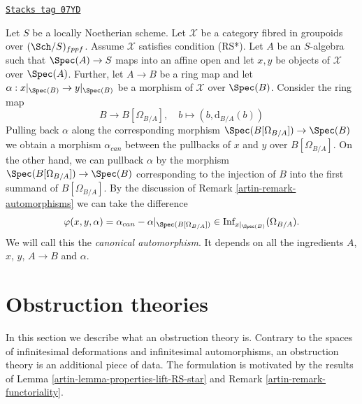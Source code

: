 \begin{remark}

\label{artin-remark-canonical-isomorphism}
\href{https://stacks.math.columbia.edu/tag/07YD}{\texttt{Stacks tag 07YD}}

Let $S$ be a locally Noetherian scheme. Let $\mathcal{X}$ be a category
fibred in groupoids over $(\Sch/S)_{fppf}$. Assume $\mathcal{X}$ satisfies
condition (RS*). Let $A$ be an $S$-algebra such that
$\Spec(A) \to S$ maps into an affine open and let $x, y$ be objects of
$\mathcal{X}$ over $\Spec(A)$. Further, let $A \to B$ be a ring map and
let $\alpha : x|_{\Spec(B)} \to y|_{\Spec(B)}$ be a morphism of
$\mathcal{X}$ over $\Spec(B)$. Consider the ring map
$$
B \longrightarrow B[\Omega_{B/A}],
\quad
b \longmapsto (b, \text{d}_{B/A}(b))
$$
Pulling back $\alpha$ along the corresponding morphism
$\Spec(B[\Omega_{B/A}]) \to \Spec(B)$ we obtain a
morphism $\alpha_{can}$ between the pullbacks of $x$ and $y$ over
$B[\Omega_{B/A}]$. On the other hand, we can pullback $\alpha$
by the morphism $\Spec(B[\Omega_{B/A}]) \to \Spec(B)$ corresponding
to the injection of $B$ into the first summand of $B[\Omega_{B/A}]$.
By the discussion of Remark \ref{artin-remark-automorphisms}
we can take the difference
$$
\varphi(x, y, \alpha) = \alpha_{can} - \alpha|_{\Spec(B[\Omega_{B/A}])} \in
\text{Inf}_{x|_{\Spec(B)}}(\Omega_{B/A}).
$$
We will call this the {\it canonical automorphism}. It depends
on all the ingredients $A$, $x$, $y$, $A \to B$ and $\alpha$.
\end{remark}

\section{Obstruction theories}
\label{artin-section-obstruction-theory}
In this section we describe what an obstruction theory is.
Contrary to the spaces of infinitesimal deformations and infinitesimal
automorphisms, an obstruction theory is an additional piece of data.
The formulation is motivated by the results of
Lemma \ref{artin-lemma-properties-lift-RS-star}
and Remark \ref{artin-remark-functoriality}.

